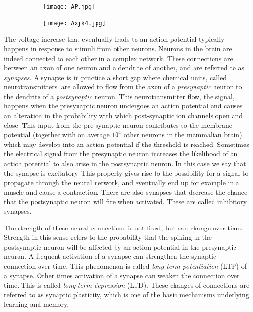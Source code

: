 \begin{figure}[h]
\caption{Graphical representation of an action potential (left). Illustration of action potential propagating along axon (right).}
\label{AP}
\begin{subfigure}
\centering
\texttt{[image: AP.jpg]}
\end{subfigure}
\begin{subfigure}
\centering
\texttt{[image: Axjk4.jpg]}
\end{subfigure}
\end{figure} 

The voltage increase that eventually leads to an action potential typically happens in response to stimuli from other neurons. Neurons in the brain are indeed connected to each other in a complex network. These connections are between an axon of one neuron and a dendrite of another, and are referred to as \textit{synapses}. A synapse is in practice a short gap where chemical units, called neurotransmitters, are allowed to flow from the axon of a \textit{presynaptic} neuron to the dendrite of a \textit{postsynaptic} neuron. This neurotransmitter flow, the signal, happens when the presynaptic neuron undergoes an action potential and causes an alteration in the probability with which post-synaptic ion channels open and close. This input from the pre-synaptic neuron contributes to the membrane potential (together with on average $10^4$ other neurons in the mammalian brain) which  may develop into an action potential if the threshold is reached. Sometimes the electrical signal from the presynaptic neuron increases the likelihood of an action potential to also arise in the postsynaptic neuron. In this case we say that the synapse is excitatory. This property gives rise to the possibility for a signal to propagate through the neural network, and eventually end up for example in a muscle and cause a contraction. There are also synapses that decrease the chance that the postsynaptic neuron will fire when activated. These are called inhibitory synapses.

The strength of these neural connections is not fixed, but can change over time. Strength in this sense refers to the probability that the spiking in the postsynaptic neuron will be affected by an action potential in the presynaptic neuron. A frequent activation of a synapse can strengthen the synaptic connection over time. This phenomenon is called \textit{long-term potentiation} (LTP) of a synapse. Other times activation of a synapse can weaken the connection over time. This is called \textit{long-term depression} (LTD). These changes of connections are referred to as synaptic plasticity, which is one of the basic mechanisms underlying learning and memory. \\


